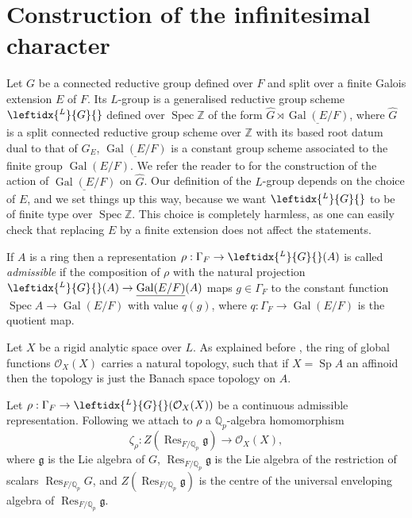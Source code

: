 \documentclass{amsart}
\theoremstyle{definition}
\theoremstyle{remark}
\DeclareMathOperator{\Res}{Res}
\DeclareMathOperator{\Gal}{Gal}
\DeclareMathOperator{\Spec}{Spec}
\DeclareMathOperator{\Sp}{Sp}
\newcommand{\Qp}{\mathbb {Q}_p}
\newcommand{\ZZ}{\mathbb Z}
\newcommand{\OO}{\mathcal O}
\newcommand{\Ghat}{\widehat{G}}
\newcommand{\LG}{\leftidx{^L}{G}{}}
\begin{document}
\section{Construction of the infinitesimal character}\label{sec_constr}

Let $G$ be a connected reductive group defined 
over $F$ and split over a finite Galois extension $E$ of $F$. Its $L$-group is a generalised reductive group scheme $\LG$ defined over $\Spec \ZZ$ of the
form $\Ghat\rtimes \underline{\Gal(E/F)}$, where 
$\Ghat$ is a split connected reductive group scheme over $\ZZ$ 
with its based root datum dual to that of $G_E$, $\underline{\Gal(E/F)}$ is a constant group scheme associated to the finite group $\Gal(E/F)$. We refer the reader to \cite[Section 2]{DPS} for the construction of the action of $\underline{\Gal(E/F)}$
on $\Ghat$. Our definition of the 
$L$-group depends on the choice of 
$E$, and we set things up this way, because we want $\LG$ to be of finite type over $\Spec \ZZ$. This choice is completely harmless, as one can easily check that replacing $E$ by a finite extension does not affect the statements.  

If $A$ is a ring then 
a  representation $\rho: \Gamma_F \rightarrow \LG(A)$ is called \textit{admissible} if the 
composition of $\rho$ with the natural projection $\LG(A)\rightarrow \underline{\Gal(E/F)}(A)$ 
maps $g\in \Gamma_F$ to the constant function 
$\Spec A\rightarrow \Gal(E/F)$ with value $q(g)$, 
where $q: \Gamma_F \rightarrow \Gal(E/F)$ is the quotient map. 

Let $X$ be a rigid analytic space over $L$.
As explained before , the ring 
of global functions $\OO_X(X)$ carries a natural topology, 
such that if $X= \Sp A$ an affinoid then the topology is just
the Banach space topology on $A$.



Let $\rho: \Gamma_F \rightarrow \LG(\OO_X(X))$ be a continuous 
admissible representation. Following  \cite[Definition 4.1]{DPS} we attach to $\rho$ a $\Qp$-algebra homomorphism 
$$\zeta_{\rho}: Z(\Res_{F/\Qp} \mathfrak g)\rightarrow \OO_X(X),$$
where $\mathfrak g$ is the Lie algebra of $G$, $\Res_{F/\Qp} \mathfrak g$ is the Lie algebra
of the restriction of scalars $\Res_{F/\Qp} G$, 
and $Z(\Res_{F/\Qp} \mathfrak g)$ is the centre of the 
universal enveloping algebra of 
$\Res_{F/\Qp} \mathfrak g$.
\end{document}
